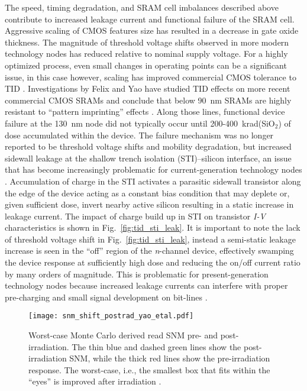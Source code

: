 The speed, timing degradation, and SRAM cell imbalances described above contribute to increased leakage current and functional failure of the SRAM cell.
Aggressive scaling of CMOS features size has resulted in a decrease in gate oxide thickness.
The magnitude of threshold voltage shifts observed in more modern technology nodes has reduced relative to nominal supply voltage. 
For a highly optimized process, even small changes in operating points can be a significant issue, in this case however, scaling has improved commercial CMOS tolerance to TID \cite{Barnaby:2006cp,Felix:2006jl}. 
Investigations by Felix and Yao have studied TID effects on more recent commercial CMOS SRAMs and conclude that below 90~nm SRAMs are highly resistant to ``pattern imprinting'' effects \cite{Felix:2006jl,Yao:2008ce,Nair:2013to}.
Along those lines, functional device failure at the 130~nm node did not typically occur until 200-400~krad(SiO$_2$) of dose accumulated within the device.
The failure mechanism was no longer reported to be threshold voltage shifts and mobility degradation, but increased sidewall leakage at the shallow trench isolation (STI)--silicon interface, an issue that has become increasingly problematic for current-generation technology nodes \cite{Felix:2006jl,Barnaby:2006cp}. 
Accumulation of charge in the STI activates a parasitic sidewall transistor along the edge of the device acting as a constant bias condition that may deplete or, given sufficient dose, invert nearby active silicon resulting in a static increase in leakage current.
The impact of charge build up in STI on transistor \emph{I-V} characteristics is shown in Fig.~\ref{fig:tid_sti_leak}.
It is important to note the lack of threshold voltage shift in Fig.~\ref{fig:tid_sti_leak}, instead a semi-static leakage increase is seen in the ``off'' region of the \emph{n}-channel device, effectively swamping the device response at sufficiently high dose and reducing the on/off current ratio by many orders of magnitude.
This is problematic for present-generation technology nodes because increased leakage currents can interfere with proper pre-charging and small signal development on bit-lines \cite{Yao:2008ce}.

\begin{figure}[htbp]
    \begin{center}
        \texttt{[image: snm\_shift\_postrad\_yao\_etal.pdf]}
    \end{center}
    \caption[Worst-case Monte Carlo derived read SNM pre- and post-irradiation. The thin blue and dashed green lines show the post-irradiation SNM, while the thick red lines show the pre-irradiation response. The worst-case, i.e., the smallest box that fits within the ``eyes'' is improved after irradiation.]{Worst-case Monte Carlo derived read SNM pre- and post-irradiation. The thin blue and dashed green lines show the post-irradiation SNM, while the thick red lines show the pre-irradiation response. The worst-case, i.e., the smallest box that fits within the ``eyes'' is improved after irradiation \cite{Yao:2008ce}.}
    \label{fig:snm_shift_tid_yao}
\end{figure}

